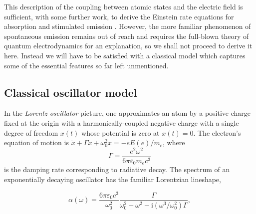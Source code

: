 
	This description of the coupling between atomic states and the electric field is sufficient, with some further work, to derive the Einstein rate equations for absorption and stimulated emission \cite{FootAtomic}. However, the more familiar phenomenon of spontaneous emission remains out of reach and requires the full-blown theory of quantum electrodynamics for an explanation, so we shall not proceed to derive it here. Instead we will have to be satisfied with a classical model which captures some of the essential features so far left unmentioned.



	\subsection*{Classical oscillator model}

	In the \emph{Lorentz oscillator} picture, one approximates an atom by a positive charge fixed at the origin with a harmonically-coupled negative charge with a single degree of freedom $x(t)$ whose potential is zero at $x(t)=0$. The electron's equation of motion is $\ddot{x} + \Gamma\dot{x} + \omega_0^2x = -e E(e)/m_e$, where
	\begin{equation}
		\Gamma = \frac{e^2\omega^2}{6\pi \varepsilon_0 m_e c^3}
	\end{equation}
	is the damping rate corresponding to radiative decay. The spectrum of an exponentially decaying oscillator has the familiar Lorentzian lineshape,

	\begin{equation}
		\alpha(\omega) = \frac{6\pi\varepsilon_0c^3}{\omega_0^2}\frac{\Gamma}{\omega_0^2-\omega^2-\textrm{i}(\omega^3/\omega_0^2)\Gamma},
	\end{equation}

